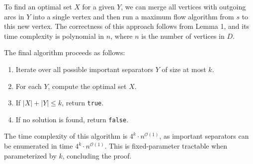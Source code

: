 \documentclass[12pt]{article}
\begin{document}
	\medskip
	
	To find an optimal set \(X\) for a given \(Y\), we can merge all vertices
	with outgoing arcs in \(Y\) into a single vertex and then run a maximum flow
	algorithm from \(s\) to this new vertex. The correctness of this approach
	follows from Lemma 1, and its time complexity is polynomial in \(n\), where
	\(n\) is the number of vertices in \(D\).
	
	\medskip
	
	The final algorithm proceeds as follows:
	\begin{enumerate}
		\item Iterate over all possible important separators \(Y\) of size at
		      most \(k\).
		\item For each \(Y\), compute the optimal set \(X\).
		\item If \(|X| + |Y| \leqslant k\), return \texttt{true}.
		\item If no solution is found, return \texttt{false}.
	\end{enumerate}
	The time complexity of this algorithm is \(4^{k} \cdot n^{\mathcal{O}(1)}\),
	as important separators can be enumerated in time \(4^{k} \cdot
	n^{\mathcal{O}(1)}\). This is fixed-parameter tractable when parameterized
	by \(k\), concluding the proof.
\end{document}

